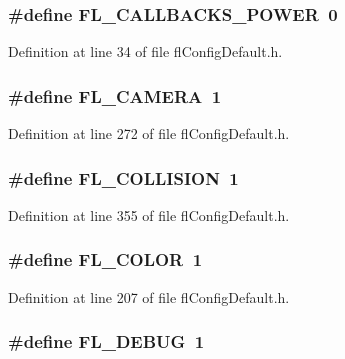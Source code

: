 \subsubsection{\setlength{\rightskip}{0pt plus 5cm}\#define FL\_\-CALLBACKS\_\-POWER~0}\label{flConfigDefault_8h_87448450a6222c3f1acafdff8ab19228}




Definition at line 34 of file fl\-Config\-Default.h.
\subsubsection{\setlength{\rightskip}{0pt plus 5cm}\#define FL\_\-CAMERA~1}\label{flConfigDefault_8h_a7de82853426d18ce06eefa638794755}




Definition at line 272 of file fl\-Config\-Default.h.
\subsubsection{\setlength{\rightskip}{0pt plus 5cm}\#define FL\_\-COLLISION~1}\label{flConfigDefault_8h_f9bd7e87bc35c7daf3ab38aed815d716}




Definition at line 355 of file fl\-Config\-Default.h.
\subsubsection{\setlength{\rightskip}{0pt plus 5cm}\#define FL\_\-COLOR~1}\label{flConfigDefault_8h_8678a4ea968ca1b77b6706816438daee}




Definition at line 207 of file fl\-Config\-Default.h.
\subsubsection{\setlength{\rightskip}{0pt plus 5cm}\#define FL\_\-DEBUG~1}\label{flConfigDefault_8h_923af823da4f8ccb7d3a71cda2011862}




